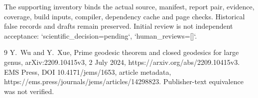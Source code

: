 \documentclass[10pt]{article}
\begin{document}
The supporting inventory binds the actual source, manifest, report pair, evidence, coverage, build inputs, compiler, dependency cache and page checks. Historical false records and drafts remain preserved. Initial review is not independent acceptance: `scientific\_decision=pending`, `human\_reviews=[]`.\par
9 Y. Wu and Y. Xue, Prime geodesic theorem and closed geodesics for large genus, arXiv:2209.10415v3, 2 July 2024, https://arxiv.org/abs/2209.10415v3. EMS Press, DOI 10.4171/jems/1653, article metadata, https://ems.press/journals/jems/articles/14298823. Publisher-text equivalence was not verified.\par
\end{document}
